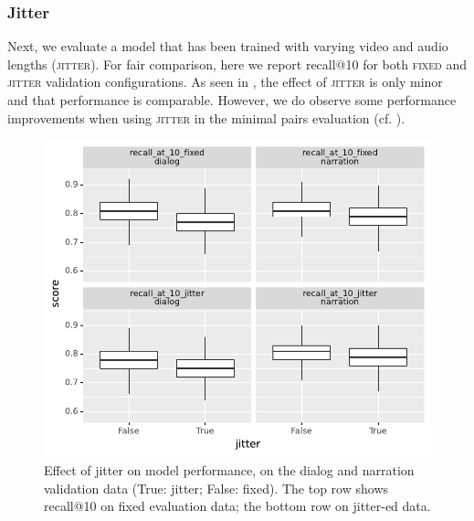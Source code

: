 \subsubsection{Jitter}
Next, we evaluate a model that has been trained with varying video and audio 
lengths (\textsc{jitter}). For fair comparison, here we report recall@10 for both 
\textsc{fixed} and \textsc{jitter} validation configurations.
As seen in , the effect of \textsc{jitter} is only
minor and that performance is comparable.
However, we do observe some 
performance improvements when using \textsc{jitter} in the
minimal pairs evaluation (cf. ).
\begin{figure}[htb]
	\centering
	\includegraphics[width=\columnwidth]{results/ablations/jitter.pdf}
	\caption{Effect of jitter on model performance, on the dialog
          and narration validation data (True: jitter; False:
          fixed). The top row shows recall@10 on {\sc fixed}
          evaluation data; the bottom row on {\sc jitter}-ed data.}
	\label{fig:jitter}
\end{figure}



